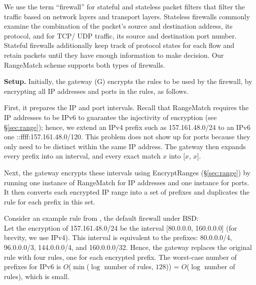 We use the term ``firewall'' for stateful and stateless packet filters that filter the traffic based on network layers and transport layers. Stateless firewalls commonly examine the combination of the packet's source and destination address, its protocol, and for TCP/ UDP traffic, its source and destination port number. Stateful firewalls additionally keep track of protocol states for each flow and retain packets until they have enough information to make decision. 
Our RangeMatch scheme supports both types of firewalls. %

\noindent\textbf{Setup.} Initially, the gateway (G) encrypts the rules to be used by the firewall, by encrypting all IP addresses and ports in the rules, as follows.

First, it prepares the IP and port intervals. Recall that RangeMatch requires the IP addresses to be IPv6 to guarantee the injectivity of encryption (see \S\ref{sec:range}); hence, we extend an IPv4 prefix  such as 157.161.48.0/24 to an IPv6 one  ::ffff:157.161.48.0/120. 
This problem does not show up for ports because they only need to be distinct within the same IP address.
The gateway then expands every prefix into an interval, and every exact match $x$ into [$x$, $x$]. 

Next, the gateway encrypts these intervals using EncryptRanges (\S\ref{sec:range}) by running one instance of RangeMatch for IP addresses and one instance for ports.
It then converts each encrypted IP range into a set of prefixes and duplicates the rule for each prefix in this set. 

Consider an example rule from  , the 
default firewall under BSD:
  \\ 
Let the encryption of 157.161.48.0/24 be the interval [80.0.0.0, 160.0.0.0] (for brevity, we use IPv4). 
This interval is equivalent to the prefixes: 80.0.0.0/4, 96.0.0.0/3, 144.0.0.0/4, and 160.0.0.0/32. 
Hence, the gateway replaces the original rule with four rules, one for each encrypted prefix. 
The worst-case number of prefixes for IPv6 is $O$($\min$($\log$ number of rules, $128$)) = $O$($\log$ number of rules), 
which is small. 







